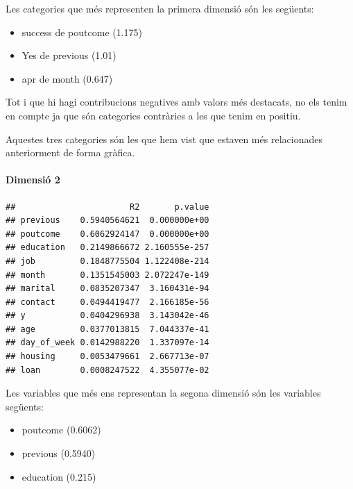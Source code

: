 \documentclass[
]{article}
\newenvironment{Shaded}{\begin{snugshade}}{\end{snugshade}}
\newcommand{\AttributeTok}[1]{\textcolor[rgb]{0.77,0.63,0.00}{#1}}
\newcommand{\NormalTok}[1]{#1}
\newcommand{\SpecialCharTok}[1]{\textcolor[rgb]{0.00,0.00,0.00}{#1}}
\newcommand{\StringTok}[1]{\textcolor[rgb]{0.31,0.60,0.02}{#1}}
\begin{document}
Les categories que més representen la primera dimensió són les següents:

\begin{itemize}
\item
  success de poutcome (1.175)
\item
  Yes de previous (1.01)
\item
  apr de month (0.647)
\end{itemize}

Tot i que hi hagi contribucions negatives amb valors més destacats, no
els tenim en compte ja que són categories contràries a les que tenim en
positiu.

Aquestes tres categories són les que hem vist que estaven més
relacionades anteriorment de forma gràfica.

\hypertarget{dimensiuxf3-2}{%
\paragraph{Dimensió 2}\label{dimensiuxf3-2}}

\begin{Shaded}
\end{Shaded}

\begin{verbatim}
##                       R2       p.value
## previous    0.5940564621  0.000000e+00
## poutcome    0.6062924147  0.000000e+00
## education   0.2149866672 2.160555e-257
## job         0.1848775504 1.122408e-214
## month       0.1351545003 2.072247e-149
## marital     0.0835207347  3.160431e-94
## contact     0.0494419477  2.166185e-56
## y           0.0404296938  3.143042e-46
## age         0.0377013815  7.044337e-41
## day_of_week 0.0142988220  1.337097e-14
## housing     0.0053479661  2.667713e-07
## loan        0.0008247522  4.355077e-02
\end{verbatim}

Les variables que més ens representan la segona dimensió són les
variables següents:

\begin{itemize}
\item
  poutcome (0.6062)
\item
  previous (0.5940)
\item
  education (0.215)
\end{itemize}
\end{document}
